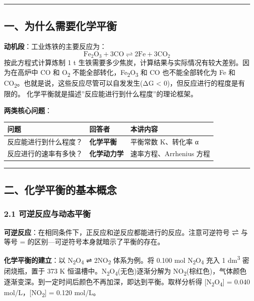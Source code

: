 \documentclass[a4paper,11pt]{ctexart}
\newcounter{none}
\begin{document}
\begin{center}\rule{0.5\linewidth}{0.5pt}\end{center}

\subsection{一、为什么需要化学平衡}\label{ux4e00ux4e3aux4ec0ux4e48ux9700ux8981ux5316ux5b66ux5e73ux8861}

\textbf{动机段}：工业炼铁的主要反应为：
\[\mathrm{Fe_2O_3 + 3CO \rightleftharpoons 2Fe + 3CO_2}\]
按此方程式计算炼制 1 t 生铁需要多少焦炭，计算结果与实际情况有较大差别。因为在高炉中 CO 和 O\textsubscript{2} 不能全部转化，Fe\textsubscript{2}O\textsubscript{3} 和 CO 也不能全部转化为 Fe 和 CO\textsubscript{2}。也就是说，这些反应尽管可以自发发生(ΔG \textless{} 0)，但反应进行的程度是有限的。
化学平衡就是描述''反应能进行到什么程度''的理论框架。

\textbf{两类核心问题}：

{\def\LTcaptype{none} %
\begin{longtable}[]{@{}lll@{}}
\toprule\noalign{}
问题 & 回答者 & 本讲内容 \\
\midrule\noalign{}
\endhead
\bottomrule\noalign{}
\endlastfoot
反应能进行到什么程度？ & \textbf{化学平衡} & 平衡常数 K、转化率 α \\
反应进行的速率有多快？ & \textbf{化学动力学} & 速率方程、Arrhenius 方程 \\
\end{longtable}
}

\begin{center}\rule{0.5\linewidth}{0.5pt}\end{center}

\subsection{二、化学平衡的基本概念}\label{ux4e8cux5316ux5b66ux5e73ux8861ux7684ux57faux672cux6982ux5ff5}

\subsubsection{2.1 可逆反应与动态平衡}\label{ux53efux9006ux53cdux5e94ux4e0eux52a8ux6001ux5e73ux8861}

\textbf{可逆反应}：在相同条件下，正反应和逆反应都能进行的反应。注意可逆符号 ⇌ 与等号 = 的区别---可逆符号本身就暗示了平衡的存在。

\textbf{化学平衡的建立}：以 N\textsubscript{2}O\textsubscript{4} ⇌ 2NO\textsubscript{2} 体系为例。将 0.100 mol N\textsubscript{2}O\textsubscript{4} 充入 1 dm\textsuperscript{3} 密闭烧瓶，置于 373 K 恒温槽中。N\textsubscript{2}O\textsubscript{4}(无色)逐渐分解为 NO\textsubscript{2}(棕红色)，气体颜色逐渐变深。到一定时间后颜色不再加深，即达到平衡。取样分析得 {[}N\textsubscript{2}O\textsubscript{4}{]} = 0.040 mol/L，{[}NO\textsubscript{2}{]} = 0.120 mol/L。
\end{document}
